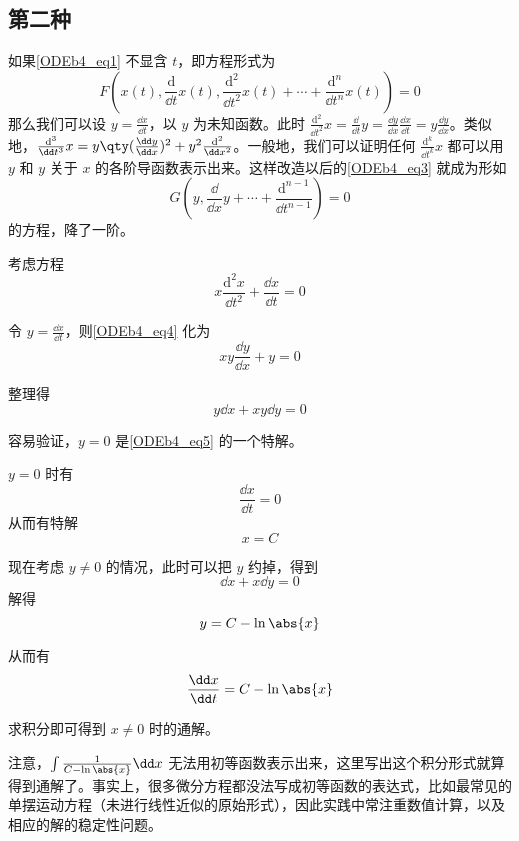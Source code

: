 \subsection{第二种}

如果\autoref{ODEb4_eq1} 不显含 $t$，即方程形式为
\begin{equation}\label{ODEb4_eq3}
F(x(t), \frac{\mathrm{d}}{\dd t}x(t), \frac{\mathrm{d}^2}{\dd t^2}x(t)+\cdots+\frac{\mathrm{d}^n}{\dd t^n}x(t))=0
\end{equation}
那么我们可以设 $y=\frac{\dd x}{\dd t}$，以 $y$ 为未知函数。此时 $\frac{\mathrm{d}^2}{\dd t^2}x=\frac{\dd}{\dd t}y=\frac{\dd y}{\dd x}\frac{\dd x}{\dd t}=y\frac{\dd y}{\dd x}$。类似地，$\frac{\mathrm{d}^3}{\dd t^3}x=y\qty(\frac{\dd y}{\dd x})^2+y^2\frac{\mathrm{d}^2}{\dd x^2}$。一般地，我们可以证明任何 $\frac{\mathrm{d}^k}{\dd t^k}x$ 都可以用 $y$ 和 $y$ 关于 $x$ 的各阶导函数表示出来。这样改造以后的\autoref{ODEb4_eq3} 就成为形如
\begin{equation}
G(y, \frac{\dd}{\dd x}y+\cdots+\frac{\mathrm{d}^{n-1}}{\dd t^{n-1}})=0
\end{equation}
的方程，降了一阶。

\begin{example}{}
考虑方程
\begin{equation}\label{ODEb4_eq4}
x\frac{\mathrm{d}^2 x}{\dd t^2}+\frac{\dd x}{\dd t}=0
\end{equation}

令 $y=\frac{\dd x}{\dd t}$，则\autoref{ODEb4_eq4} 化为
\begin{equation}\label{ODEb4_eq5}
xy\frac{\dd y}{\dd x}+y=0
\end{equation}

整理得
\begin{equation}
y\dd x+xy\dd y=0
\end{equation}

容易验证，$y=0$ 是\autoref{ODEb4_eq5} 的一个特解。

$y=0$ 时有
\begin{equation}
\frac{\dd x}{\dd t}=0
\end{equation}
从而有特解
\begin{equation}
x=C
\end{equation}

现在考虑 $y\neq 0$ 的情况，此时可以把 $y$ 约掉，得到
\begin{equation}\label{ODEb4_eq6}
\dd x+x\dd y=0
\end{equation}
解得
\begin{equation}
y=C-\ln\abs{x}
\end{equation}

从而有
\begin{equation}
\frac{\dd x}{\dd t}=C-\ln\abs{x}
\end{equation}

求积分即可得到 $x\neq 0$ 时的通解。

注意，$\int\frac{1}{C-\ln\abs{x}}\dd x$ 无法用初等函数表示出来，这里写出这个积分形式就算得到通解了。事实上，很多微分方程都没法写成初等函数的表达式，比如最常见的单摆运动方程（未进行线性近似的原始形式），因此实践中常注重数值计算，以及相应的解的稳定性问题。

\end{example}


